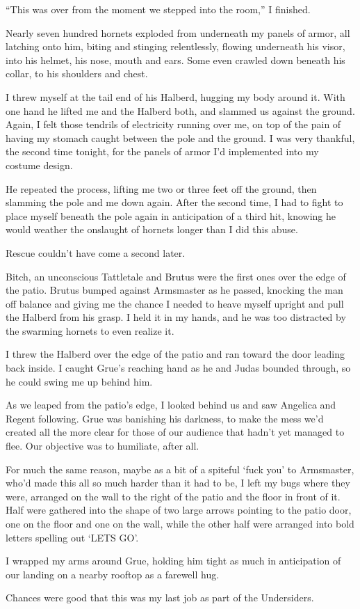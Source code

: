 ``This was over from the moment we stepped into the room,'' I finished.



Nearly seven hundred hornets exploded from underneath my panels of armor, all latching onto him, biting and stinging relentlessly, flowing underneath his visor, into his helmet, his nose, mouth and ears.  Some even crawled down beneath his collar, to his shoulders and chest.



I threw myself at the tail end of his Halberd, hugging my body around it.  With one hand he lifted me and the Halberd both, and slammed us against the ground.  Again, I felt those tendrils of electricity running over me, on top of the pain of having my stomach caught between the pole and the ground.  I was very thankful, the second time tonight, for the panels of armor I'd implemented into my costume design.



He repeated the process, lifting me two or three feet off the ground, then slamming the pole and me down again.  After the second time, I had to fight to place myself beneath the pole again in anticipation of a third hit, knowing he would weather the onslaught of hornets longer than I did this abuse.



Rescue couldn't have come a second later.



Bitch, an unconscious Tattletale and Brutus were the first ones over the edge of the patio.  Brutus bumped against Armsmaster as he passed, knocking the man off balance and giving me the chance I needed to heave myself upright and pull the Halberd from his grasp.  I held it in my hands, and he was too distracted by the swarming hornets to even realize it.



I threw the Halberd over the edge of the patio and ran toward the door leading back inside.  I caught Grue's reaching hand as he and Judas bounded through, so he could swing me up behind him.



As we leaped from the patio's edge, I looked behind us and saw Angelica and Regent following.  Grue was banishing his darkness, to make the mess we'd created all the more clear for those of our audience that hadn't yet managed to flee.  Our objective was to humiliate, after all.



For much the same reason, maybe as a bit of a spiteful `fuck you' to Armsmaster, who'd made this all so much harder than it had to be, I left my bugs where they were, arranged on the wall to the right of the patio and the floor in front of it.  Half were gathered into the shape of two large arrows pointing to the patio door, one on the floor and one on the wall, while the other half were arranged into bold letters spelling out `LETS GO'.



I wrapped my arms around Grue, holding him tight as much in anticipation of our landing on a nearby rooftop as a farewell hug.



Chances were good that this was my last job as part of the Undersiders.





